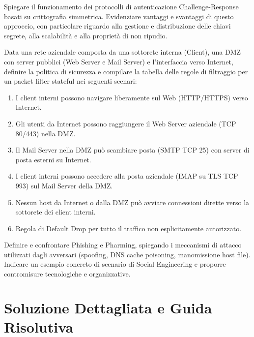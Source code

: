 \documentclass[11pt,a4paper]{article}
\begin{document}
\begin{questionbox}
Spiegare il funzionamento dei protocolli di autenticazione Challenge-Response basati su crittografia simmetrica. Evidenziare vantaggi e svantaggi di questo approccio, con particolare riguardo alla gestione e distribuzione delle chiavi segrete, alla scalabilit\`a e alla propriet\`a di non ripudio.
\end{questionbox}

\begin{questionbox}
Data una rete aziendale composta da una sottorete interna (Client), una DMZ con server pubblici (Web Server e Mail Server) e l'interfaccia verso Internet, definire la politica di sicurezza e compilare la tabella delle regole di filtraggio per un packet filter stateful nei seguenti scenari:
\begin{enumerate}[label=\alph*.]
    \item I client interni possono navigare liberamente sul Web (HTTP/HTTPS) verso Internet.
    \item Gli utenti da Internet possono raggiungere il Web Server aziendale (TCP 80/443) nella DMZ.
    \item Il Mail Server nella DMZ pu\`o scambiare posta (SMTP TCP 25) con server di posta esterni su Internet.
    \item I client interni possono accedere alla posta aziendale (IMAP su TLS TCP 993) sul Mail Server della DMZ.
    \item Nessun host da Internet o dalla DMZ pu\`o avviare connessioni dirette verso la sottorete dei client interni.
    \item Regola di Default Drop per tutto il traffico non esplicitamente autorizzato.
\end{enumerate}
\end{questionbox}

\begin{questionbox}
Definire e confrontare Phishing e Pharming, spiegando i meccanismi di attacco utilizzati dagli avversari (spoofing, DNS cache poisoning, manomissione host file). Indicare un esempio concreto di scenario di Social Engineering e proporre contromisure tecnologiche e organizzative.
\end{questionbox}

\newpage
\section{Soluzione Dettagliata e Guida Risolutiva}
\end{document}
